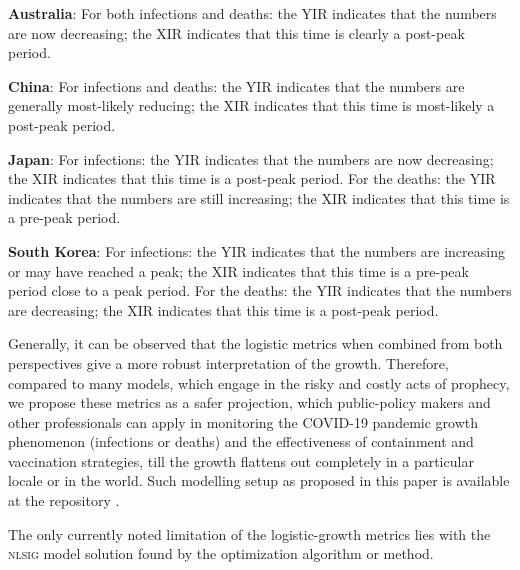 \documentclass[journal]{IEEEtran}
\theoremstyle{plain}
\theoremstyle{definition}
\theoremstyle{remark}
\begin{document}
\textbf{Australia}: For both infections and deaths: the YIR indicates that the numbers are now decreasing; the XIR indicates that this time is clearly a post-peak period.

\textbf{China}: For infections and deaths: the YIR indicates that the numbers are generally most-likely reducing; the XIR indicates that this time is most-likely a post-peak period.

\textbf{Japan}: For infections: the YIR indicates that the numbers are now decreasing; the XIR indicates that this time is a post-peak period. For the deaths: the YIR indicates that the numbers are still increasing; the XIR indicates that this time is a pre-peak period.

\textbf{South Korea}: For infections: the YIR indicates that the numbers are increasing or may have reached a peak; the XIR indicates that this time is a pre-peak period close to a peak period. For the deaths: the YIR indicates that the numbers are decreasing; the XIR indicates that this time is a post-peak period.

Generally, it can be observed that the logistic metrics when combined from both perspectives give a more robust interpretation of the growth. Therefore, compared to many models, which engage in the risky and costly acts of prophecy, we propose these metrics as a safer projection, which public-policy makers and other professionals can apply in monitoring the COVID-19 pandemic growth phenomenon (infections or deaths) and the effectiveness of containment and vaccination strategies, till the growth flattens out completely in a particular locale or in the world. Such modelling  setup as proposed in this paper is available at the repository \cite{somefunSomefunAgbaNLSIGCOVID19Lab2020}.

The only currently noted limitation of the logistic-growth metrics lies with the \textsc{nlsig} model solution found by the optimization algorithm or method.
\end{document}
